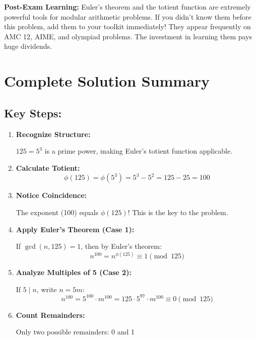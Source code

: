 \documentclass[12pt]{article}
\begin{document}
\vspace{1em}

\begin{protipbox}
\textbf{Post-Exam Learning:} Euler's theorem and the totient function are extremely powerful tools for modular arithmetic problems. If you didn't know them before this problem, add them to your toolkit immediately! They appear frequently on AMC 12, AIME, and olympiad problems. The investment in learning them pays huge dividends.
\end{protipbox}

\newpage

\section*{Complete Solution Summary}

\subsection*{Key Steps:}

\begin{enumerate}
    \item \textbf{Recognize Structure:} 
    
    $125 = 5^3$ is a prime power, making Euler's totient function applicable.
    
    \item \textbf{Calculate Totient:}
    \[
    \phi(125) = \phi(5^3) = 5^3 - 5^2 = 125 - 25 = 100
    \]
    
    \item \textbf{Notice Coincidence:}
    
    The exponent (100) equals $\phi(125)$! This is the key to the problem.
    
    \item \textbf{Apply Euler's Theorem (Case 1):}
    
    If $\gcd(n, 125) = 1$, then by Euler's theorem:
    \[
    n^{100} = n^{\phi(125)} \equiv 1 \pmod{125}
    \]
    
    \item \textbf{Analyze Multiples of 5 (Case 2):}
    
    If $5 \mid n$, write $n = 5m$:
    \[
    n^{100} = 5^{100} \cdot m^{100} = 125 \cdot 5^{97} \cdot m^{100} \equiv 0 \pmod{125}
    \]
    
    \item \textbf{Count Remainders:}
    
    Only two possible remainders: 0 and 1
\end{enumerate}
\end{document}
